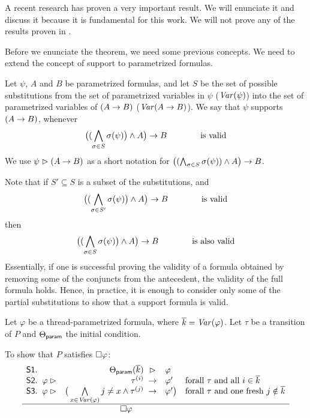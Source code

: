A recent research  has proven a very important result. 
%
We will enunciate it and discuss it because it is fundamental for this work. 
%
We will not prove any of the results proven in \citep{paperParametrizedInvariants}.

Before we enunciate the theorem, we need some previous concepts.
%
We need to extend the concept of support to parametrized formulas.


\begin{defn}[Support]
  Let $\psi$, $A$ and $B$ be parametrized formulas, and let $S$ be the
  set of possible substitutions from the set of parametrized variables in $\psi$ ($\mathit{Var}(\psi)$) into the set of parametrized variables of $(A\mathrel{\rightarrow} B)$ ($\mathit{Var}(A\mathrel{\rightarrow} B)$).
%
  We say that $\psi$ supports $(A\mathrel{\rightarrow} B)$, whenever
%
  \[ \big( (\bigwedge_{\sigma\in S} \sigma(\psi)\big) \wedge A\big) \mathrel{\rightarrow} B \hspace{4em} \text{is valid} \]
%
  We use $\psi\mathrel{\rhd}(A\mathrel{\rightarrow} B)$ as a short notation for
  $\big((\bigwedge_{\sigma\in S} \sigma(\psi)) \wedge A\big) \mathrel{\rightarrow} B$.  
\end{defn}

Note that if $S'\subseteq S$ is a subset of the substitutions, and 
%
  \[ \big( (\bigwedge_{\sigma\in S'} \sigma(\psi)\big) \wedge A\big) \mathrel{\rightarrow} B \hspace{4em} \text{is valid} \]
%
then
%
  \[ \big( (\bigwedge_{\sigma\in S} \sigma(\psi)\big) \wedge A\big) \mathrel{\rightarrow} B \hspace{4em} \text{is also valid} \]
%
  Essentially, if one is successful proving the validity of a formula obtained by removing some of the conjuncts from the antecedent, the validity of the full formula holds.
%
  Hence, in practice, it is enough to consider only some of the partial substitutions to show that a support formula is valid.


\begin{itheorem}
	Let $\varphi$ be a thread-parametrized formula, where $\overline{k}=\mathit{Var}(\varphi)$. 
	Let $\tau$ be a transition of $P$ and $\Theta_{\textsf{param}}$ the initial condition.

	To show that $P$ satisfies $\square\varphi$:
	\hspace{-1em}
	\[ 
		\begin{array}{r@{\;\;}lr@{\;}@{\;}cl@{\hspace{1em}}l}
			\Premise{S1}. & & \ThetaParam(\overline{k}) &\supports & \varphi & \\

			\Premise{S2}. & \varphi \supports & \tau^{(i)} &\Into& \varphi'  & \text{forall $\tau$ and all $i\in \overline{k}$}\\
			\Premise{S3}. & \varphi\supports & \big(\bigwedge\limits_{x\in\Var(\varphi)} j\neq x \andcond \tau^{(j)} &\Into& \varphi' \big)& \text{forall $\tau$ and one fresh $j\notin\overline{k}$}\\ \hline
			& \multicolumn{4}{c}{\hspace{3em} \Always \varphi} &
		\end{array}
	\]
\label{thm:biggest}
\end{itheorem}



